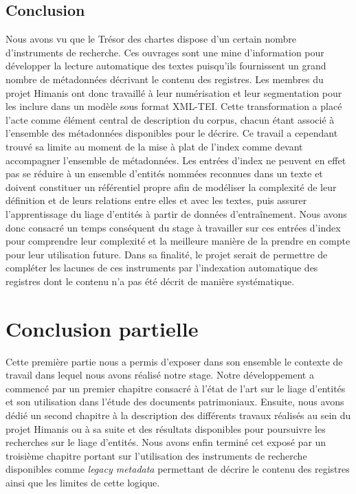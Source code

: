 \documentclass[a4paper,12pt,twoside]{book}
\begin{document}
	\section*{Conclusion}
	
	Nous avons vu que le Trésor des chartes dispose d'un certain nombre d'instruments de recherche. Ces ouvrages sont une mine d'information pour développer la lecture automatique des textes puisqu'ils fournissent un grand nombre de métadonnées décrivant le contenu des registres. Les membres du projet Himanis ont donc travaillé à leur numérisation et leur segmentation pour les inclure dans un modèle sous format XML-TEI. Cette transformation a placé l'acte comme élément central de description du corpus, chacun étant associé à l'ensemble des métadonnées disponibles pour le décrire. Ce travail a cependant trouvé sa limite au moment de la mise à plat de l'index comme devant accompagner l'ensemble de métadonnées. Les entrées d'index ne peuvent en effet pas se réduire à un ensemble d'entités nommées reconnues dans un texte et doivent constituer un référentiel propre afin de modéliser la complexité de leur définition et de leurs relations entre elles et avec les textes, puis assurer l'apprentissage du liage d'entités à partir de données d'entraînement. Nous avons donc consacré un temps conséquent du stage à travailler sur ces entrées d'index pour comprendre leur complexité et la meilleure manière de la prendre en compte pour leur utilisation future. Dans sa finalité, le projet serait de permettre de compléter les lacunes de ces instruments par l'indexation automatique des registres dont le contenu n'a pas été décrit de manière systématique.
	
	\chapter*{Conclusion partielle}
	
	Cette première partie nous a permis d'exposer dans son ensemble le contexte de travail dans lequel nous avons réalisé notre stage. Notre développement a commencé par un premier chapitre consacré à l'état de l'art sur le liage d'entités et son utilisation dans l'étude des documents patrimoniaux. Ensuite, nous avons dédié un second chapitre à la description des différents travaux réalisés au sein du projet Himanis ou à sa suite et des résultats disponibles pour poursuivre les recherches sur le liage d'entités. Nous avons enfin terminé cet exposé par un troisième chapitre portant sur l'utilisation des instruments de recherche disponibles comme \textit{legacy metadata} permettant de décrire le contenu des registres ainsi que les limites de cette logique.
	
\end{document}
